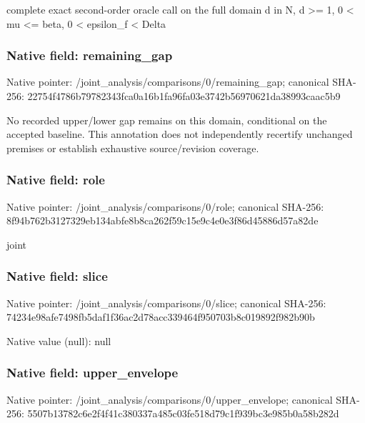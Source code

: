 \documentclass[10pt,a4paper]{article}
\begin{document}
\begingroup\raggedright{} complete exact second-order oracle call on the full domain d in N,\allowbreak{} d >=\allowbreak{} 1,\allowbreak{} 0 < mu <=\allowbreak{} beta,\allowbreak{} 0 < epsilon\_\allowbreak{}f < Delta\par\endgroup

\subsubsection{Native field: remaining\_\allowbreak{}gap}
Native pointer: /joint\_\allowbreak{}analysis/comparisons/0/remaining\_\allowbreak{}gap; canonical SHA-256: 22754f4786b79782343fca0a16b1fa96fa03e3742b56970621da38993caac5b9

\begingroup\raggedright\sloppy No recorded upper/\allowbreak{}lower gap remains on this domain,\allowbreak{} conditional on the accepted baseline. This annotation does not independently recertify unchanged premises or establish exhaustive source/\allowbreak{}revision coverage.\par\endgroup

\subsubsection{Native field: role}
Native pointer: /joint\_\allowbreak{}analysis/comparisons/0/role; canonical SHA-256: 8f94b762b3127329eb134abfe8b8ca262f59c15e9c4e0e3f86d45886d57a82de

\begingroup\raggedright\sloppy joint\par\endgroup

\subsubsection{Native field: slice}
Native pointer: /joint\_\allowbreak{}analysis/comparisons/0/slice; canonical SHA-256: 74234e98afe7498fb5daf1f36ac2d78acc339464f950703b8c019892f982b90b

Native value (null): null

\subsubsection{Native field: upper\_\allowbreak{}envelope}
Native pointer: /joint\_\allowbreak{}analysis/comparisons/0/upper\_\allowbreak{}envelope; canonical SHA-256: 5507b13782c6e2f4f41c380337a485c03fe518d79c1f939bc3e985b0a58b282d
\end{document}
